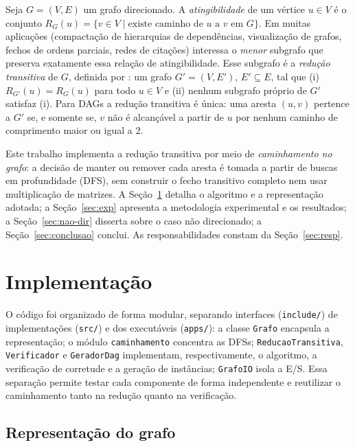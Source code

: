 \documentclass{sbc2023}%
\begin{document}
Seja $G=(V,E)$ um grafo direcionado. A \emph{atingibilidade} de um vértice $u \in V$ é o conjunto $R_G(u)=\{v \in V \mid \text{existe caminho de } u \text{ a } v \text{ em } G\}$. Em muitas aplicações (compactação de hierarquias de dependências, visualização de grafos, fechos de ordens parciais, redes de citações) interessa o \emph{menor} subgrafo que preserva exatamente essa relação de atingibilidade. Esse subgrafo é a \emph{redução transitiva} de $G$, definida por \cite{aho1972}: um grafo $G'=(V,E')$, $E' \subseteq E$, tal que (i) $R_{G'}(u)=R_G(u)$ para todo $u \in V$ e (ii) nenhum subgrafo próprio de $G'$ satisfaz (i). Para DAGs a redução transitiva é única: uma aresta $(u,v)$ pertence a $G'$ se, e somente se, $v$ não é alcançável a partir de $u$ por nenhum caminho de comprimento maior ou igual a 2.

Este trabalho implementa a redução transitiva por meio de \emph{caminhamento no grafo}: a decisão de manter ou remover cada aresta é tomada a partir de buscas em profundidade (DFS), sem construir o fecho transitivo completo nem usar multiplicação de matrizes. A Seção~\ref{sec:impl} detalha o algoritmo e a representação adotada; a Seção~\ref{sec:exp} apresenta a metodologia experimental e os resultados; a Seção~\ref{sec:nao-dir} disserta sobre o caso não direcionado; a Seção~\ref{sec:conclusao} conclui. As responsabilidades constam da Seção~\ref{sec:resp}.

\section{Implementação}
\label{sec:impl}

O código foi organizado de forma modular, separando interfaces (\texttt{include/}) de implementações (\texttt{src/}) e dos executáveis (\texttt{apps/}): a classe \texttt{Grafo} encapsula a representação; o módulo \texttt{caminhamento} concentra as DFSs; \texttt{ReducaoTransitiva}, \texttt{Verificador} e \texttt{GeradorDag} implementam, respectivamente, o algoritmo, a verificação de corretude e a geração de instâncias; \texttt{GrafoIO} isola a E/S. Essa separação permite testar cada componente de forma independente e reutilizar o caminhamento tanto na redução quanto na verificação.

\subsection{Representação do grafo}
\label{sec:repr}
\end{document}

